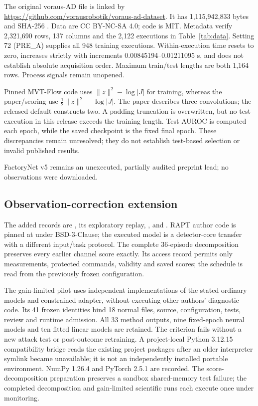 The original voraus-AD file is linked by \url{https://github.com/vorausrobotik/voraus-ad-dataset}. It has 1,115,942,833 bytes and SHA-256 . Data are CC BY-NC-SA 4.0; code is MIT. Metadata verify 2,321,690 rows, 137 columns and the 2,122 executions in Table~\ref{tab:data}. Setting 72 (PRE\_A) supplies all 948 training executions. Within-execution time resets to zero, increases strictly with increments 0.00845194--0.01211095 s, and does not establish absolute acquisition order. Maximum train/test lengths are both 1,164 rows. Process signals remain unopened.

Pinned MVT-Flow code  uses $\|z\|^2-\log|J|$ for training, whereas the paper/scoring use $\tfrac12\|z\|^2-\log|J|$. The paper describes three convolutions; the released default constructs two. A padding truncation is overwritten, but no test execution in this release exceeds the training length. Test AUROC is computed each epoch, while the saved checkpoint is the fixed final epoch. These discrepancies remain unresolved; they do not establish test-based selection or invalid published results.

FactoryNet v5 remains an unexecuted, partially audited preprint lead; no observations were downloaded.

\subsection{Observation-correction extension}
The added records are , its exploratory replay, , and . RAPT author code is pinned at  under BSD-3-Clause; the executed model is a detector-core transfer with a different input/task protocol. The complete 36-episode decomposition preserves every earlier channel score exactly. Its access record permits only measurements, protected commands, validity and saved scores; the schedule is read from the previously frozen configuration.

The gain-limited pilot uses independent implementations of the stated ordinary models and constrained adapter, without executing other authors' diagnostic code. Its 41 frozen identities bind 18 normal files, source, configuration, tests, review and runtime admission. All 33 method outputs, nine fixed-epoch neural models and ten fitted linear models are retained. The criterion fails without a new attack test or post-outcome retraining. A project-local Python 3.12.15 compatibility bridge reads the existing project packages after an older interpreter symlink became unavailable; it is not an independently installed portable environment. NumPy 1.26.4 and PyTorch 2.5.1 are recorded. The score-decomposition preparation preserves a sandbox shared-memory test failure; the completed decomposition and gain-limited scientific runs each execute once under monitoring.
